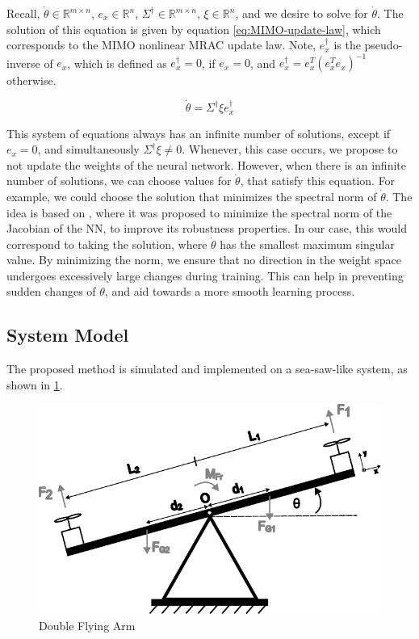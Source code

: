 Recall, $\dot\theta\in\mathbb{R}^{m\times n}$, $e_x \in\mathbb{R}^{n}$, $\Sigma^{\dagger}\in\mathbb{R}^{m\times n}$, $\xi\in\mathbb{R}^{n}$, and we desire to solve for $\dot\theta$. The solution of this equation is given by equation \eqref{eq:MIMO-update-law}, which corresponds to the MIMO nonlinear MRAC update law. Note, $e_x^{\dagger}$ is the pseudo-inverse of $e_x$, which is defined as $e_x^{\dagger}=0$, if $e_x=0$, and $e_x^{\dagger}=e_x^T(e_x^Te_x)^{-1}$ otherwise.

\begin{equation}
\dot\theta =\Sigma^{\dagger}\xi e_x^{\dagger}
    \label{eq:MIMO-update-law}
\end{equation}

This system of equations always has an infinite number of solutions, except if  $e_x=0$, and simultaneously $\Sigma^{\dagger}\xi\neq 0$. Whenever, this case occurs, we propose to not update the weights of the neural network. However, when there is an infinite number of solutions, we can choose values for $\dot\theta$, that satisfy this equation. For example, we could choose the solution that minimizes the spectral norm of $\dot\theta$. The idea is based on \cite{yoshida2017spectralnormregularizationimproving, johansson_improved_2023}, where it was proposed to minimize the spectral norm of the Jacobian of the NN, to improve its robustness properties. In our case, this would correspond to taking the solution, where $\dot\theta$ has the smallest maximum singular value. By minimizing the norm, we ensure that no direction in the weight space undergoes excessively large changes during training. This can help in preventing sudden changes of $\theta$, and aid towards a more smooth learning process.

\subsection{System Model}
The proposed method is simulated and implemented on a sea-saw-like system, as shown in \cref{fig:flying-arm}.

\begin{figure}
    \includegraphics[width=\linewidth]{images/DoubleFlyingArm.pdf}
    \caption{Double Flying Arm}
    \label{fig:flying-arm}
\end{figure}

